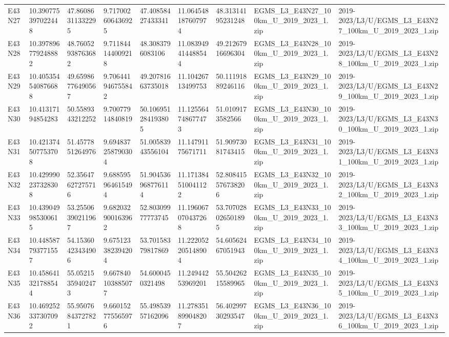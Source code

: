 \begin{landscape}
\begin{longtable}{lllllllll}
E43N27 & 10.390775397022448 & 47.86086311332295 & 9.717002606436925 & 47.40858427433341 & 11.064548187607974 & 48.31314195231248 & EGMS\_L3\_E43N27\_100km\_U\_2019\_2023\_1.zip & 2019-2023/L3/U/EGMS\_L3\_E43N27\_100km\_U\_2019\_2023\_1.zip \\
E43N28 & 10.397896779248882 & 48.76052938763682 & 9.711844144009218 & 48.3083796083106 & 11.083949414488544 & 49.21267916696304 & EGMS\_L3\_E43N28\_100km\_U\_2019\_2023\_1.zip & 2019-2023/L3/U/EGMS\_L3\_E43N28\_100km\_U\_2019\_2023\_1.zip \\
E43N29 & 10.405354540876688 & 49.65986776490567 & 9.706441946755842 & 49.20781663735018 & 11.10426713499753 & 50.11191889246116 & EGMS\_L3\_E43N29\_100km\_U\_2019\_2023\_1.zip & 2019-2023/L3/U/EGMS\_L3\_E43N29\_100km\_U\_2019\_2023\_1.zip \\
E43N30 & 10.41317194854283 & 50.5589343212252 & 9.70077914840819 & 50.106951284193805 & 11.125564748677473 & 51.0109173582566 & EGMS\_L3\_E43N30\_100km\_U\_2019\_2023\_1.zip & 2019-2023/L3/U/EGMS\_L3\_E43N30\_100km\_U\_2019\_2023\_1.zip \\
E43N31 & 10.421374507753708 & 51.4577851264976 & 9.694837258790304 & 51.00583943556104 & 11.14791175671711 & 51.90973081743415 & EGMS\_L3\_E43N31\_100km\_U\_2019\_2023\_1.zip & 2019-2023/L3/U/EGMS\_L3\_E43N31\_100km\_U\_2019\_2023\_1.zip \\
E43N32 & 10.429990237328308 & 52.35647627275716 & 9.688595964615494 & 51.904536968776114 & 11.171384510041122 & 52.808415576738206 & EGMS\_L3\_E43N32\_100km\_U\_2019\_2023\_1.zip & 2019-2023/L3/U/EGMS\_L3\_E43N32\_100km\_U\_2019\_2023\_1.zip \\
E43N33 & 10.439049985300615 & 53.25506390211967 & 9.682032900163962 & 52.80309977773745 & 11.196067070437268 & 53.707028026501895 & EGMS\_L3\_E43N33\_100km\_U\_2019\_2023\_1.zip & 2019-2023/L3/U/EGMS\_L3\_E43N33\_100km\_U\_2019\_2023\_1.zip \\
E43N34 & 10.448587793771557 & 54.15360423434906 & 9.675123382394204 & 53.70158379817869 & 11.222052205148904 & 54.60562467051943 & EGMS\_L3\_E43N34\_100km\_U\_2019\_2023\_1.zip & 2019-2023/L3/U/EGMS\_L3\_E43N34\_100km\_U\_2019\_2023\_1.zip \\
E43N35 & 10.458641321788544 & 55.05215359402473 & 9.667840103885077 & 54.6000450321498 & 11.24944253969201 & 55.50426215589965 & EGMS\_L3\_E43N35\_100km\_U\_2019\_2023\_1.zip & 2019-2023/L3/U/EGMS\_L3\_E43N35\_100km\_U\_2019\_2023\_1.zip \\
E43N36 & 10.469252337307092 & 55.95076843727821 & 9.660152775565976 & 55.49853957162096 & 11.278351899048207 & 56.40299730293547 & EGMS\_L3\_E43N36\_100km\_U\_2019\_2023\_1.zip & 2019-2023/L3/U/EGMS\_L3\_E43N36\_100km\_U\_2019\_2023\_1.zip \\

\end{longtable}
\end{landscape}
